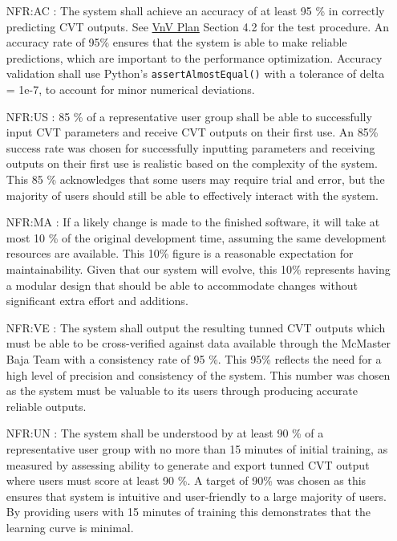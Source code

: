 \documentclass[12pt]{article}
\begin{document}
\noindent \begin{itemize}

\item[NFR:AC \label{NFR:AC}:] The system shall achieve an accuracy of at least 95 \% in correctly predicting CVT outputs. 
See \href{https://github.com/gr812b/CVT-Simulator/blob/main/docs/VnVPlan/VnVPlan.pdf}{VnV Plan} Section 4.2 for the test procedure. An accuracy rate of 95\% ensures that the system is able to make reliable predictions, which are important to the performance optimization. 
Accuracy validation shall use Python’s \texttt{assertAlmostEqual()} with a tolerance of delta = 1e-7, to account for minor numerical deviations.
\item[NFR:US \label{NFR:US}:] 85 \% of a representative user group shall be able to successfully input CVT parameters and receive CVT outputs on their first use.
An 85\% success rate was chosen for successfully inputting parameters and receiving outputs on their first use is realistic based on the complexity of the system. 
This 85 \% acknowledges that some users may require trial and error, but the majority of users should still be able to effectively interact with the system. 
\item[NFR:MA \label{NFR:MA}:] If a likely change is made to the finished software, it will take at most 10 \% of the original development time, assuming the same development resources are available.
This 10\% figure is a reasonable expectation for maintainability. 
Given that our system will evolve, this 10\% represents having a modular design that should be able to accommodate changes without significant extra effort and additions. 
\item[NFR:VE \label{NFR:VE}:] The system shall output the resulting tunned CVT outputs which must be able to be cross-verified against data available through the McMaster Baja Team with a consistency rate of 95 \%.
This 95\% reflects the need for a high level of precision and consistency of the system. 
This number was chosen as the system must be valuable to its users through producing accurate reliable outputs. 
\item[NFR:UN \label{NFR:UN}:] The system shall be understood by at least 90 \% of a representative user group with no more than 15 minutes of initial training, as measured by assessing ability to generate and export tunned CVT output where users must score at least 90 \%.
A target of 90\% was chosen as this ensures that system is intuitive and user-friendly to a large majority of users. 
By providing users with 15 minutes of training this demonstrates that the learning curve is minimal. 

\end{itemize}
\end{document}
